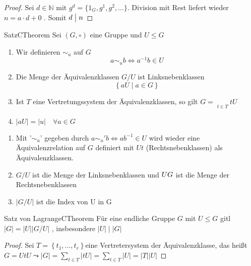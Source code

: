\documentclass[a4paper]{memoir}
\begin{document}
\begin{proof}
    Sei $ d \in \mathbb{N} $  mit $ g^d = \{1_G, g^1, g^2, \dots \} $. Division mit Rest liefert wieder $ n = a \cdot d + 0  $ . Somit $ d \bigm| n $   
\end{proof}

\begin{ibox}{1.12}{Satz}{CTheorem}
    Sei $ (G, \circ) $  eine Gruppe und $ U \leq G $ 

    \begin{enumerate}[label=\alph*)]
        \item Wir definieren $ \sim_u $ auf $ G $ 
            $$ a \sim_u b \iff a^{-1}b \in U $$
        \item Die Menge der Äquivalenzklassen $  G/U  $ ist Linksnebenklassen
           $$ \left\{ aU \;|\; a \in G \right\}  $$
            
        \item Ist $ T $ eine Vertretungssystem der Äquivalenzklassen, so gilt $ G = 
            \mathop{\dot{\bigcup}}\limits_{t \in T} t U$ 
        \item $ |a U| = |u| \quad \forall a \in G $ 

            
    \end{enumerate}

\end{ibox}

\begin{enumerate}[label=\alph*)]
    \item Mit '$ \sim_{u} $' gegeben durch $ a \sim_{u}' b \iff ab^{-1} \in U $
        wird wieder eine Äquivalenzrelation auf $ G $  definiert mit $ Ut $ 
        (Rechtsnebenklassen) als Äquivalenzklassen.
    \item $ G / U $ ist die Menge der Linksnebenklassen und $ U\\G $ ist die Menge
        der Rechtsnebenklassen
    \item $ \left| G/U \right|  $ ist die Index von U in G
\end{enumerate}

\begin{ibox}{1.13}{Satz von Lagrange}{CTheorem}
    Für eine endliche Gruppe $ G $ mit $ U \leq G $  gitl $ \left| G \right| = 
    \left| U \right| \left| G/U \right| $ , insbesondere $ \left| U \right| 
    \mid \left| G \right| $ 
\end{ibox}
\begin{proof}
    Sei $ T = \left\{ t_1, \dots , t_{r} \right\}$eine Vertretersystem der
    Äquivalenzklasse, das heißt $ G = UtU \leadsto \left| G \right| = 
    \sum_{t \in T} \left| tU \right| = \sum_{t \in T} \left| U \right| = 
    \left| T \right| \left| U \right| $ 
\end{proof}
\end{document}
